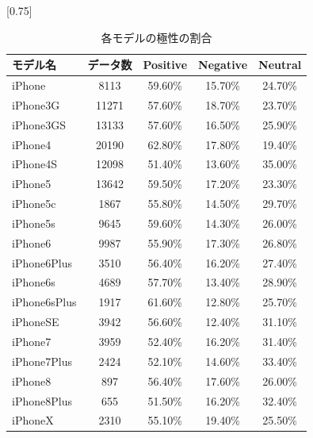 \documentclass[uplatex,11pt]{jsarticle}
\begin{document}
\begin{table}
    \begin{center}
        \small
        \caption{各モデルの極性の割合}
        \scalebox{0.9}[0.75]{
            \begin{tabular}{|l|cccc|}
                \hline
                モデル名      & データ数  & Positive & Negative & Neutral \\ \hline
                iPhone       & 8113  & 59.60\%      & 15.70\%      & 24.70\%     \\
                iPhone3G     & 11271 & 57.60\%      & 18.70\%      & 23.70\%     \\
                iPhone3GS    & 13133 & 57.60\%      & 16.50\%      & 25.90\%     \\
                iPhone4      & 20190 & 62.80\%      & 17.80\%      & 19.40\%     \\
                iPhone4S     & 12098 & 51.40\%      & 13.60\%      & 35.00\%     \\
                iPhone5      & 13642 & 59.50\%      & 17.20\%      & 23.30\%     \\
                iPhone5c     & 1867  & 55.80\%      & 14.50\%      & 29.70\%     \\
                iPhone5s     & 9645  & 59.60\%      & 14.30\%      & 26.00\%     \\
                iPhone6      & 9987  & 55.90\%      & 17.30\%      & 26.80\%     \\
                iPhone6Plus  & 3510  & 56.40\%      & 16.20\%      & 27.40\%     \\
                iPhone6s     & 4689  & 57.70\%      & 13.40\%      & 28.90\%     \\
                iPhone6sPlus & 1917  & 61.60\%      & 12.80\%      & 25.70\%     \\
                iPhoneSE     & 3942  & 56.60\%      & 12.40\%      & 31.10\%     \\
                iPhone7      & 3959  & 52.40\%      & 16.20\%      & 31.40\%     \\
                iPhone7Plus  & 2424  & 52.10\%      & 14.60\%      & 33.40\%     \\
                iPhone8      & 897   & 56.40\%      & 17.60\%      & 26.00\%     \\
                iPhone8Plus  & 655   & 51.50\%      & 16.20\%      & 32.40\%     \\
                iPhoneX      & 2310  & 55.10\%      & 19.40\%      & 25.50\%     \\ \hline
            \end{tabular}
        }
    \end{center}
\end{table}
\end{document}
